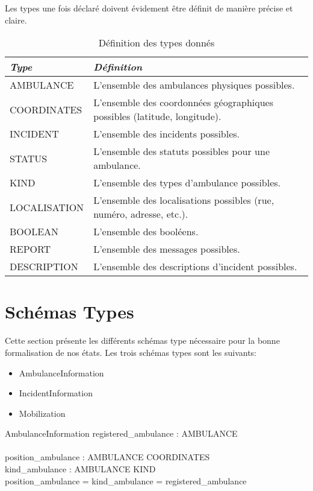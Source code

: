 \documentclass{report}
\begin{document}
Les types une fois déclaré doivent évidement être définit de 
manière précise et claire. 
\begin{table}[!h]
\begin{minipage}{\marginparsep+\marginparwidth+\marginparpush+\textwidth}
	\begin{tabularx}{\textwidth}{|l|X|}
		\hline 
		\textit{Type} & \textit{Définition} \\
		\hline
		AMBULANCE & L'ensemble des ambulances physiques possibles. \\
		\hline
		COORDINATES & L'ensemble des coordonnées géographiques possibles (latitude, longitude). \\
		\hline
		INCIDENT & L'ensemble des incidents possibles. \\
		\hline
		STATUS & L'ensemble des statuts possibles pour une ambulance. \\
		\hline
		KIND & L'ensemble des types d'ambulance possibles. \\
		\hline
		LOCALISATION & L'ensemble des localisations possibles (rue, numéro, adresse, etc.). \\
		\hline
		BOOLEAN & L'ensemble des booléens. \\
		\hline
		REPORT & L'ensemble des messages possibles. \\
		\hline
		DESCRIPTION & L'ensemble des descriptions d'incident possibles. \\
		\hline
	\end{tabularx}
	\caption{Définition des types donnés}\label{tab:typedefinition}
\end{minipage}
\end{table}

\section{Schémas Types}\label{sec:sctype}
Cette section présente les différents schémas type nécessaire pour la 
bonne formalisation de nos états. Les trois schémas types sont 
les suivants: 
\begin{itemize}
	\item AmbulanceInformation
	\item IncidentInformation
	\item Mobilization
\end{itemize}

\begin{schema}{AmbulanceInformation}
 	registered\_ambulance : \power AMBULANCE \\
	\newline \\
 	position\_ambulance : AMBULANCE \pinj COORDINATES \\
 	kind\_ambulance : AMBULANCE \pfun KIND \\
  \where
  	\dom position\_ambulance = \dom kind\_ambulance = registered\_ambulance
\end{schema}
\end{document}
